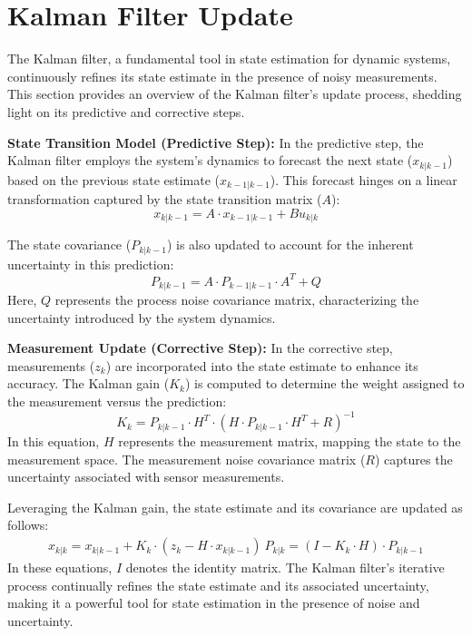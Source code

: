 \section{Kalman Filter Update}
\label{sec:kf}
The Kalman filter, a fundamental tool in state estimation for dynamic systems, continuously refines its state estimate in the presence of noisy measurements. This section provides an overview of the Kalman filter's update process, shedding light on its predictive and corrective steps.

\textbf{State Transition Model (Predictive Step):}
In the predictive step, the Kalman filter employs the system's dynamics to forecast the next state ($x_{k|k-1}$) based on the previous state estimate ($x_{k-1|k-1}$). This forecast hinges on a linear transformation captured by the state transition matrix ($A$):
\begin{equation*}
x_{k|k-1} = A \cdot x_{k-1|k-1} + B u_{k|k}
\end{equation*}

The state covariance ($P_{k|k-1}$) is also updated to account for the inherent uncertainty in this prediction:
\begin{equation*}
P_{k|k-1} = A \cdot P_{k-1|k-1} \cdot A^T + Q
\end{equation*}
Here, $Q$ represents the process noise covariance matrix, characterizing the uncertainty introduced by the system dynamics.

\textbf{Measurement Update (Corrective Step):}
In the corrective step, measurements ($z_k$) are incorporated into the state estimate to enhance its accuracy. The Kalman gain ($K_k$) is computed to determine the weight assigned to the measurement versus the prediction:
\begin{equation*}
K_k = P_{k|k-1} \cdot H^T \cdot (H \cdot P_{k|k-1} \cdot H^T + R)^{-1}
\end{equation*}
In this equation, $H$ represents the measurement matrix, mapping the state to the measurement space. The measurement noise covariance matrix ($R$) captures the uncertainty associated with sensor measurements.

Leveraging the Kalman gain, the state estimate and its covariance are updated as follows:
\begin{align*}
x_{k|k} = x_{k|k-1} + K_k \cdot (z_k - H \cdot x_{k|k-1}) \
P_{k|k} = (I - K_k \cdot H) \cdot P_{k|k-1}
\end{align*}
In these equations, $I$ denotes the identity matrix. The Kalman filter's iterative process continually refines the state estimate and its associated uncertainty, making it a powerful tool for state estimation in the presence of noise and uncertainty.

